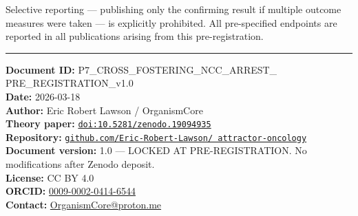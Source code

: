 \documentclass[10pt, a4paper]{article}
\begin{document}
Selective reporting --- publishing only
the confirming result if multiple outcome
measures were taken --- is explicitly
prohibited. All pre-specified endpoints
are reported in all publications arising
from this pre-registration.

\vspace{1em}
\noindent\textcolor{rulecolor}{\rule{\linewidth}{0.8pt}}
\vspace{0.3em}

{\footnotesize
\textbf{Document ID:}
P7\_CROSS\_FOSTERING\_NCC\_ARREST\_
PRE\_REGISTRATION\_v1.0\\
\textbf{Date:} 2026-03-18\\
\textbf{Author:} Eric Robert Lawson /
OrganismCore\\
\textbf{Theory paper:}
\href{https://doi.org/10.5281/zenodo.19094935}
{\texttt{doi:10.5281/zenodo.19094935}}\\
\textbf{Repository:}
\href{https://github.com/Eric-Robert-Lawson/
attractor-oncology}
{\texttt{github.com/Eric-Robert-Lawson/
attractor-oncology}}\\
\textbf{Document version:} 1.0 ---
LOCKED AT PRE-REGISTRATION.
No modifications after Zenodo deposit.\\
\textbf{License:} CC BY 4.0\\
\textbf{ORCID:}
\href{https://orcid.org/0009-0002-0414-6544}
{0009-0002-0414-6544}\\
\textbf{Contact:}
\href{mailto:OrganismCore@proton.me}
{OrganismCore@proton.me}
}
\end{document}
